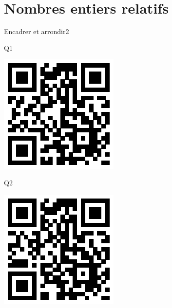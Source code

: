 \documentclass[a4paper,11pt]{report}
\begin{document}
\section*{Nombres entiers relatifs}
\begin{qmoodle}{Encadrer et arrondir}{2}{
	\begin{center}
		Q1

		\includegraphics[scale=1]{img/no2nd/ndeea/ndeea_1}
	\end{center}
	\begin{center}
		Q2

		\includegraphics[scale=1]{img/no2nd/ndeea/ndeea_2}
	\end{center}
}
\end{qmoodle}
\end{document}
